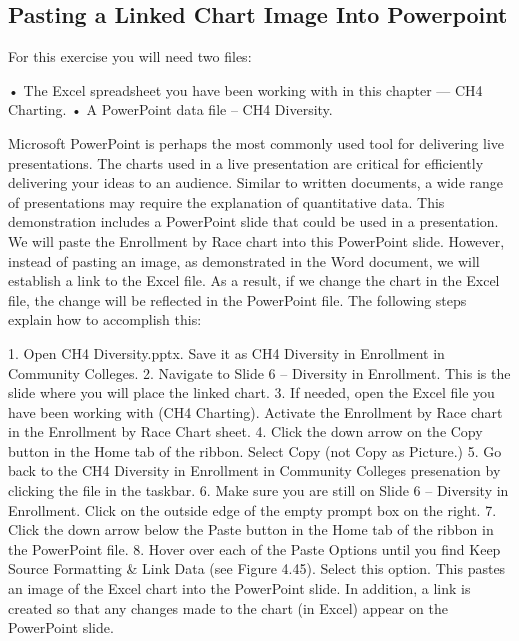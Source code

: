 \subsection{Pasting a Linked Chart Image Into Powerpoint}

For this exercise you will need two files:

• The Excel spreadsheet you have been working with in this chapter — CH4 Charting.
• A PowerPoint data file – CH4 Diversity.

Microsoft PowerPoint is perhaps the most commonly used tool for delivering live presentations. The
charts used in a live presentation are critical for efficiently delivering your ideas to an audience.
Similar to written documents, a wide range of presentations may require the explanation of
quantitative data. This demonstration includes a PowerPoint slide that could be used in a
presentation. We will paste the Enrollment by Race chart into this PowerPoint slide. However, instead
of pasting an image, as demonstrated in the Word document, we will establish a link to the Excel file.
As a result, if we change the chart in the Excel file, the change will be reflected in the PowerPoint file.
The following steps explain how to accomplish this:

1. Open CH4 Diversity.pptx. Save it as CH4 Diversity in Enrollment in Community Colleges.
2. Navigate to Slide 6 – Diversity in Enrollment. This is the slide where you will place the linked
chart.
3. If needed, open the Excel file you have been working with (CH4 Charting). Activate the
Enrollment by Race chart in the Enrollment by Race Chart sheet.
4. Click the down arrow on the Copy button in the Home tab of the ribbon. Select Copy (not
Copy as Picture.)
5. Go back to the CH4 Diversity in Enrollment in Community Colleges presenation by clicking the file
in the taskbar.
6. Make sure you are still on Slide 6 – Diversity in Enrollment. Click on the outside edge of the
empty prompt box on the right.
7. Click the down arrow below the Paste button in the Home tab of the ribbon in the PowerPoint
file.
8. Hover over each of the Paste Options until you find Keep Source Formatting \& Link Data (see
Figure 4.45). Select this option. This pastes an image of the Excel chart into the PowerPoint
slide. In addition, a link is created so that any changes made to the chart (in Excel) appear on the
PowerPoint slide.



